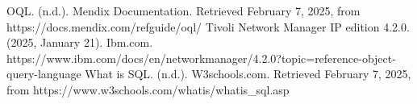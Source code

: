 \documentclass{article}
\begin{document}
\begin{thebibliography}{9}
	OQL. (n.d.). Mendix Documentation. Retrieved February 7, 2025, from https://docs.mendix.com/refguide/oql/
	Tivoli Network Manager IP edition 4.2.0. (2025, January 21). Ibm.com. https://www.ibm.com/docs/en/networkmanager/4.2.0?topic=reference-object-query-language
	What is SQL. (n.d.). W3schools.com. Retrieved February 7, 2025, from https://www.w3schools.com/whatis/whatis\_sql.asp
\end{thebibliography}
\end{document}
